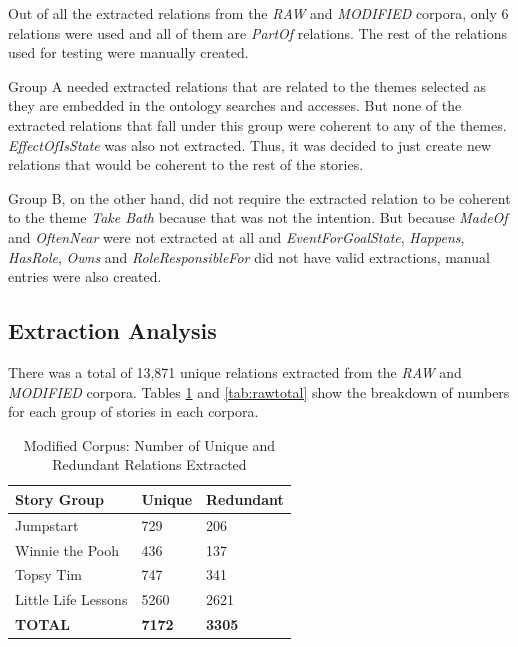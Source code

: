 Out of all the extracted relations from the \textit{RAW} and \textit{MODIFIED} corpora, only 6 relations were used and all of them are \textit{PartOf} relations. The rest of the relations used for testing were manually created. 

Group A needed extracted relations that are related to the themes selected as they are embedded in the ontology searches and accesses. But none of the extracted relations that fall under this group were coherent to any of the themes. \textit{EffectOfIsState} was also not extracted. Thus, it was decided to just create new relations that would be coherent to the rest of the stories. 

Group B, on the other hand, did not require the extracted relation to be coherent to the theme \textit{Take Bath} because that was not the intention. But because \textit{MadeOf} and \textit{OftenNear} were not extracted at all and \textit{EventForGoalState}, \textit{Happens}, \textit{HasRole}, \textit{Owns} and \textit{RoleResponsibleFor} did not have valid extractions, manual entries were also created.

\subsection{Extraction Analysis}
\label{sec:extractionanalysis}

There was a total of 13,871 unique relations extracted from the \textit{RAW} and \textit{MODIFIED} corpora. Tables \ref{tab:modifiedtotal} and \ref{tab:rawtotal} show the breakdown of numbers for each group of stories in each corpora.

\begin{table}[H]   %
\centering
\caption{Modified Corpus: Number of Unique and Redundant Relations Extracted} \vspace{0.25em}
\begin{tabular}{|p{4cm}|p{3cm}|p{3cm}|} \hline
\textbf{Story Group} & \textbf{Unique} & \textbf{Redundant} \\ \hline
Jumpstart & 729 & 206 \\ \hline
Winnie the Pooh & 436 & 137 \\ \hline
Topsy Tim & 747 & 341 \\ \hline
Little Life Lessons & 5260 & 2621 \\ \hline
\textbf{TOTAL} & \textbf{7172} & \textbf{3305} \\ \hline
\end{tabular}
\label{tab:modifiedtotal}
\end{table}

